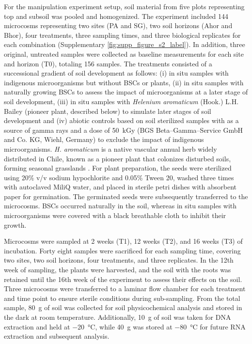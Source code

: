 For the manipulation experiment setup, soil material from five plots representing top and subsoil was pooled and homogenized. The experiment included 144 microcosms representing two sites (PA and SG), two soil horizons (Ahor and Bhor), four treatments, three sampling times, and three biological replicates for each combination (Supplementary \cref{fig:supp_figure_s2_label}). In addition, three original, untreated samples were collected as baseline measurements for each site and horizon (T0), totaling 156 samples. The treatments consisted of a successional gradient of soil development as follows: (i) in situ samples with indigenous microorganisms but without BSCs or plants, (ii) in situ samples with naturally growing BSCs to assess the impact of microorganisms at a later stage of soil development, (iii) in situ samples with \textit{Helenium aromaticum} (Hook.) L.H. Bailey (pioneer plant, described below) to simulate later stages of soil development and (iv) abiotic controls based on soil sterilized samples with  as a source of gamma rays and a dose of \SI{50}{\kilo Gy} (BGS Beta–Gamma–Service GmbH and Co. KG, Wiehl, Germany) to exclude the impact of indigenous microorganisms. \textit{H. aromaticum} is a native vascular annual herb widely distributed in Chile, known as a pioneer plant that colonizes disturbed soils, forming seasonal grasslands \citep{GomezGonzalez2011}. For plant preparation, the seeds were sterilized using 20\% v/v sodium hypochlorite and 0.05\% Tween 20, washed three times with autoclaved MiliQ water, and placed in sterile petri dishes with absorbent paper for germination. The germinated seeds were subsequently transferred to the microcosms. BSCs occurred naturally in the soil, whereas in situ samples with microorganisms were covered with a black breathable cloth to inhibit their growth.

Microcosms were sampled at 2 weeks (T1), 12 weeks (T2), and 16 weeks (T3) of incubation. Forty eight samples were sacrificed for each sampling time, covering two sites, two soil horizons, four treatments, and three replicates. In the 12th week of sampling, the plants were harvested, and the soil with the roots was retained until the 16th week of the experiment to assess their effects on the soil. Three microcosms were transferred to a laminar flow chamber for each treatment and time point to ensure sterile conditions during sub-sampling. From the total sample, \SI{80}{\gram} of soil was collected for soil physicochemical analysis and stored in the dark at room temperature. Additionally, \SI{10}{\gram} of soil was taken for DNA extraction and held at \SI{-20}{\degreeCelsius}, while \SI{40}{\gram} was stored at \SI{-80}{\degreeCelsius} for future RNA extraction and subsequent analysis.

